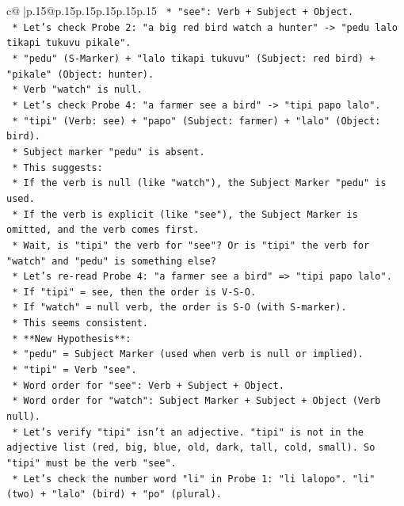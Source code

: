 \documentclass{article}
\begin{document}
{\begin{supertabular}{c@{$\;$}|p{.15\linewidth}@{}p{.15\linewidth}p{.15\linewidth}p{.15\linewidth}p{.15\linewidth}p{.15\linewidth}}
{{{\texttt{        *   "see": Verb + Subject + Object.} \\
\texttt{    *   Let's check Probe 2: "a big red bird watch a hunter" {-}> "pedu lalo tikapi tukuvu pikale".} \\
\texttt{        *   "pedu" (S{-}Marker) + "lalo tikapi tukuvu" (Subject: red bird) + "pikale" (Object: hunter).} \\
\texttt{        *   Verb "watch" is null.} \\
\texttt{    *   Let's check Probe 4: "a farmer see a bird" {-}> "tipi papo lalo".} \\
\texttt{        *   "tipi" (Verb: see) + "papo" (Subject: farmer) + "lalo" (Object: bird).} \\
\texttt{        *   Subject marker "pedu" is absent.} \\
\texttt{    *   This suggests:} \\
\texttt{        *   If the verb is null (like "watch"), the Subject Marker "pedu" is used.} \\
\texttt{        *   If the verb is explicit (like "see"), the Subject Marker is omitted, and the verb comes first.} \\
\texttt{    *   Wait, is "tipi" the verb for "see"? Or is "tipi" the verb for "watch" and "pedu" is something else?} \\
\texttt{    *   Let's re{-}read Probe 4: "a farmer see a bird" => "tipi papo lalo".} \\
\texttt{    *   If "tipi" = see, then the order is V{-}S{-}O.} \\
\texttt{    *   If "watch" = null verb, the order is S{-}O (with S{-}marker).} \\
\texttt{    *   This seems consistent.} \\
\texttt{    *   **New Hypothesis**:} \\
\texttt{        *   "pedu" = Subject Marker (used when verb is null or implied).} \\
\texttt{        *   "tipi" = Verb "see".} \\
\texttt{        *   Word order for "see": Verb + Subject + Object.} \\
\texttt{        *   Word order for "watch": Subject Marker + Subject + Object (Verb null).} \\
\texttt{    *   Let's verify "tipi" isn't an adjective. "tipi" is not in the adjective list (red, big, blue, old, dark, tall, cold, small). So "tipi" must be the verb "see".} \\
\texttt{    *   Let's check the number word "li" in Probe 1: "li lalopo". "li" (two) + "lalo" (bird) + "po" (plural).} \\
}}}
\end{supertabular}}
\end{document}
